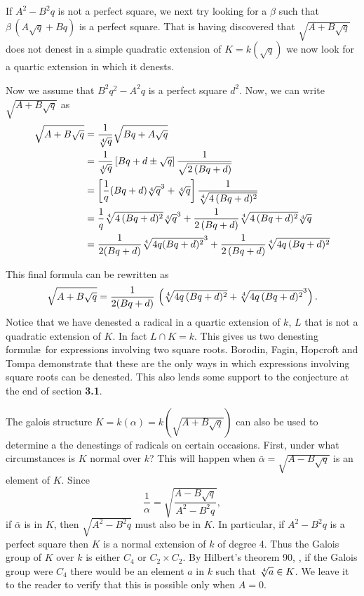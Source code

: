 If $A^2 - B^2 q$ is not a perfect square, we next try looking for a
$\beta$ such that $\beta\,(A \sqrt{q} + B q)$ is a perfect square.  That
is having discovered that $\sqrt{A + B \sqrt{q}}$ does not denest in a
simple quadratic extension of $K = k(\sqrt{q})$ we now look for a
quartic extension in which it denests.

Now we assume that $B^2 q^2 - A^2 q$ is a perfect square $d^2$.  Now, we
can write $\sqrt{A + B \sqrt{q}}$ as
\[
\begin{aligned}
\sqrt{A + B \sqrt{q}} & 
= \frac{1}{\root 4 \of q} \sqrt{B q + A \sqrt{q}}\\
&= \frac{1}{\root 4 \of q} \left[ Bq + d \pm \sqrt{q} \right]
\frac{1}{\sqrt{2\,(B q + d)}}\\
&=\left[\frac{1}{q} (B q + d) {\root 4 \of q}^3 + {\root 4 \of q}\right]
\frac{1}{\root 4 \of{4\,(B q + d)^2}}\\
&=\frac{1}{q} {\root 4\of{4\,(Bq +d)^2}} {\root 4\of q}^3
+ \frac{1}{2\,(Bq+d)} {\root 4\of{4\,(Bq+d)^2}} {\root 4\of q}\\
&= \frac{1}{ 2 (Bq +d)} {\root 4 \of{4 q(Bq+d)^2}}^3 +
\frac{1}{2\,(Bq+d)} \root 4\of{4 q\,(Bq+d)^2}
\end{aligned}
\]

This final formula can be rewritten as 
\[
\sqrt{A + B \sqrt{q}} = 
 \frac{1}{2 (Bq + d)} \,\left( \root 4\of{4q\,(Bq+d)^2} + 
{\root 4\of{4q\,(Bq+d)^2}}^3 \right).
\]
Notice that we have denested a radical in a quartic extension of $k$,
$L$ that is not a quadratic extension of $K$.  In fact $L \cap K = k$.
This gives us two denesting formul\ae\ for expressions involving two
square roots.  Borodin, Fagin, Hopcroft and Tompa
\cite{Borodin1985-gv} demonstrate that these are the only ways in
which expressions involving square roots can be denested.  This also
lends some support to the conjecture at the end of section {\bf 3.1}.

\medskip
The galois structure $K = k(\alpha) = k(\sqrt{A+B \sqrt{q}})$ can also
be used to determine a the denestings of radicals on certain occasions.
First, under what circumstances is $K$ normal over $k$?  This will
happen when $\bar \alpha = \sqrt{A - B\sqrt{q}}$ is an element of $K$.
Since 
\[
\frac{1}{\alpha} = \sqrt{\frac{A - B \sqrt{q}}{A^2 - B^2 q}},
\]
if $\bar \alpha$ is in $K$, then $\sqrt{A^2-B^2 q}$ must also be in $K$.
In particular, if $A^2 - B^2 q$ is a perfect square then $K$ is a normal
extension of $k$ of degree 4.  Thus the Galois group of $K$ over $k$ is
either $C_4$ or $C_2 \times C_2$.  By Hilbert's theorem 90,
, if the Galois group were $C_4$ there
would be an element $a$ in $k$ such that $\root 4\of a \in K$.  We
leave it to the reader to verify that this is possible only when $A = 0$.

